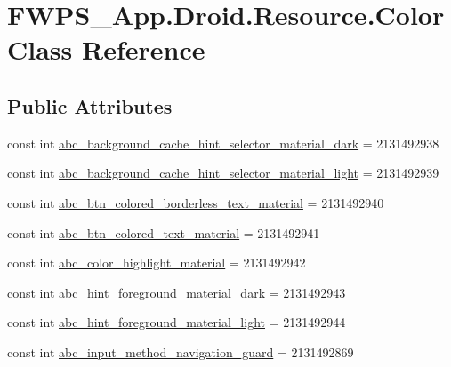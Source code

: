 \hypertarget{class_f_w_p_s___app_1_1_droid_1_1_resource_1_1_color}{}\section{F\+W\+P\+S\+\_\+\+App.\+Droid.\+Resource.\+Color Class Reference}
\label{class_f_w_p_s___app_1_1_droid_1_1_resource_1_1_color}
\subsection*{Public Attributes}
\begin{DoxyCompactItemize}
\item 
const int \mbox{\hyperlink{class_f_w_p_s___app_1_1_droid_1_1_resource_1_1_color_a3595dd83002742a843dcccf086bdd897}{abc\+\_\+background\+\_\+cache\+\_\+hint\+\_\+selector\+\_\+material\+\_\+dark}} = 2131492938
\item 
const int \mbox{\hyperlink{class_f_w_p_s___app_1_1_droid_1_1_resource_1_1_color_a9baf574552790ee361aa300f96e4eaeb}{abc\+\_\+background\+\_\+cache\+\_\+hint\+\_\+selector\+\_\+material\+\_\+light}} = 2131492939
\item 
const int \mbox{\hyperlink{class_f_w_p_s___app_1_1_droid_1_1_resource_1_1_color_a437e7a4d0a3cf87a0046e8830671bf27}{abc\+\_\+btn\+\_\+colored\+\_\+borderless\+\_\+text\+\_\+material}} = 2131492940
\item 
const int \mbox{\hyperlink{class_f_w_p_s___app_1_1_droid_1_1_resource_1_1_color_ac9242703a015e72480c9ff8aa4c91719}{abc\+\_\+btn\+\_\+colored\+\_\+text\+\_\+material}} = 2131492941
\item 
const int \mbox{\hyperlink{class_f_w_p_s___app_1_1_droid_1_1_resource_1_1_color_a1c1da0d437a52f156c8f27f872a68a00}{abc\+\_\+color\+\_\+highlight\+\_\+material}} = 2131492942
\item 
const int \mbox{\hyperlink{class_f_w_p_s___app_1_1_droid_1_1_resource_1_1_color_a8299ff188234e87264b1060d1a2bc77c}{abc\+\_\+hint\+\_\+foreground\+\_\+material\+\_\+dark}} = 2131492943
\item 
const int \mbox{\hyperlink{class_f_w_p_s___app_1_1_droid_1_1_resource_1_1_color_ab2ca0fe216e793ea7658ead5c3a194d8}{abc\+\_\+hint\+\_\+foreground\+\_\+material\+\_\+light}} = 2131492944
\item 
const int \mbox{\hyperlink{class_f_w_p_s___app_1_1_droid_1_1_resource_1_1_color_a535100c0d3d4aeb0ed7d6bfd45112dad}{abc\+\_\+input\+\_\+method\+\_\+navigation\+\_\+guard}} = 2131492869

\end{DoxyCompactItemize}
